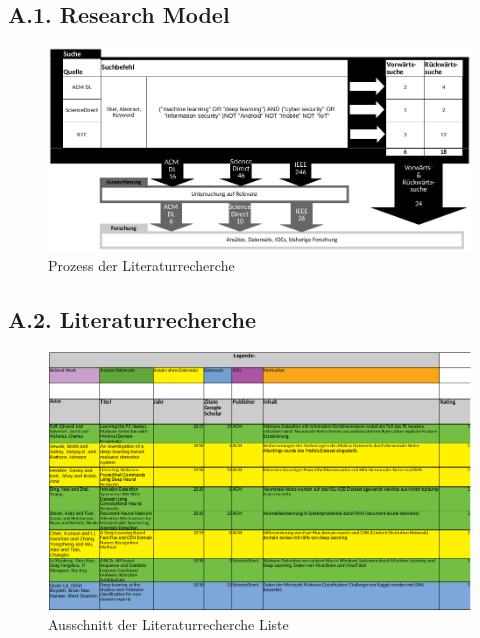 \documentclass[
    12pt, %
    DIV10,
    ngerman, %
    a4paper, %
    oneside, %
    titlepage, %
    parskip=half, %
    headings=normal, %
    listof=totoc, %
    bibliography=totoc, %
    index=totoc, %
    captions=tableheading, %
    final %
]{scrreprt}
\begin{document}
\subsection*{A.1. Research Model}\label{rm}

\begin{figure}[h!]
\hspace{-2.3cm}
\includegraphics[width=1.3\textwidth]{img/rm}
\caption*{Prozess der Literaturrecherche}
\end{figure}
\newpage
\subsection*{A.2. Literaturrecherche}\label{literaturr}

\begin{figure}[h!]
\hspace{-2.2cm}
\includegraphics[width=1.3\textwidth]{img/literaturr}
\caption*{Ausschnitt der Literaturrecherche Liste}
\end{figure}
\newpage
\end{document}

